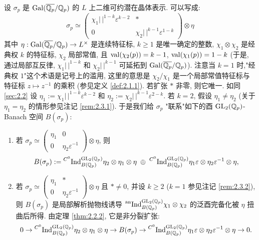 设 $\sigma_p$ 是 $\operatorname{Gal}(\overline{\mathbb{Q}_p}/\mathbb{Q}_p)$ 的 $L$ 上二维可约潜在晶体表示.
可以写成:
\[
\sigma_p \simeq \begin{pmatrix} \chi_1|\,|^{1-k}\varepsilon^{k-2} & * \\ 0 & \chi_2|\,|^{k-1}\varepsilon^{1-k} \end{pmatrix} \otimes \eta
\]
其中 $\eta : \operatorname{Gal}(\overline{\mathbb{Q}_p}/\mathbb{Q}_p) \to L^{\times}$ 是连续特征标, $k \ge 1$ 是唯一确定的整数, $\chi_1 \otimes \chi_2$ 是经典权 $k$ 的特征标, $\chi_2$ 局部常值, 且 $\operatorname{val}(\chi_2(p)) = k-1$, $\operatorname{val}(\chi_1(p)) = 1-k$ (于是, 通过局部互反律, $\chi_1|\,|^{1-k}$ 和 $\chi_2|\,|^{k-1}$ 可延拓到 $\operatorname{Gal}(\overline{\mathbb{Q}_p}/\mathbb{Q}_p)$).
注意当 $k = 1$ 时,"经典权 $1$"这个术语是记号上的滥用, 这里的意思是 $\chi_2/\chi_1$ 是一个局部常值特征标与特征标 $z \mapsto z^{-1}$ 的乘积 (参见定义 \ref{def:2.1.1}).
若扩张 $*$ 非零, 则它唯一.
如同 \ref{sec:2.2} 设 $\eta_1 := \chi_1|\,|^{1-k}\varepsilon^{k-2}$ 和 $\eta_2 := \chi_2|\,|^{k-1}\varepsilon^{2-k}$.
若 $k = 2$, 假设 $\eta_1 \neq \eta_2$ (关于 $\eta_1 = \eta_2$ 的情形参见注记 \ref{rem:2.3.1}).
于是我们给 $\sigma_p$ "联系"如下的酉 $\mathrm{GL}_2(\mathbb{Q}_p)$-Banach 空间 $B(\sigma_p)$:
\begin{enumerate}
\item[(i)] 若 $\sigma_p \simeq \begin{pmatrix} \eta_1 & 0 \\ 0 & \eta_2\varepsilon^{-1} \end{pmatrix} \otimes \eta$, 则
\[
B(\sigma_p) := \prescript{C^{0}}{}{\mathrm{Ind}}_{B(\mathbb{Q}_p)}^{\mathrm{GL}_2(\mathbb{Q}_p)} \eta_2 \otimes \eta_1 \otimes \eta \;\oplus\; \prescript{C^{0}}{}{\mathrm{Ind}}_{B(\mathbb{Q}_p)}^{\mathrm{GL}_2(\mathbb{Q}_p)} \eta_1\varepsilon \otimes \eta_2\varepsilon^{-1} \otimes \eta,
\]
\item[(ii)] 若 $\sigma_p \simeq \begin{pmatrix} \eta_1 & * \\ 0 & \eta_2\varepsilon^{-1} \end{pmatrix} \otimes \eta$ 且 $* \neq 0$, 并设 $k \ge 2$ ($k = 1$ 参见注记 \ref{rem:2.3.2}), 则 $B(\sigma_p)$ 是局部解析抛物线诱导 $\prescript{\mathrm{an}}{}{\mathrm{Ind}}_{B(\mathbb{Q}_p)}^{\mathrm{GL}_2(\mathbb{Q}_p)} \chi_1 \otimes \chi_2$ 的泛酉完备化被 $\eta$ 扭曲后所得.
由定理 \ref{thm:2.2.2}, 它是非分裂扩张:
\[
0 \to \prescript{C^{0}}{}{\mathrm{Ind}}_{B(\mathbb{Q}_p)}^{\mathrm{GL}_2(\mathbb{Q}_p)} \eta_2 \otimes \eta_1 \otimes \eta \to B(\sigma_p) \to \prescript{C^{0}}{}{\mathrm{Ind}}_{B(\mathbb{Q}_p)}^{\mathrm{GL}_2(\mathbb{Q}_p)} \eta_1\varepsilon \otimes \eta_2\varepsilon^{-1} \otimes \eta \to 0.
\]
\end{enumerate}

